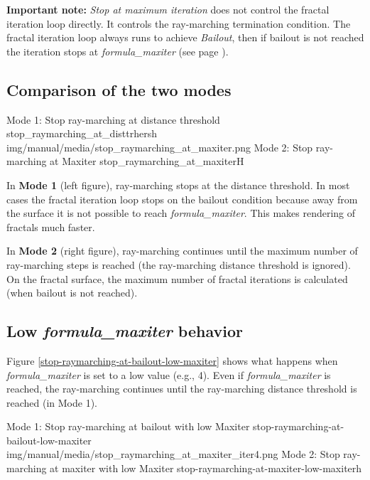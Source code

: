 \textbf{Important note:} \emph{Stop at maximum iteration} does not control the fractal iteration loop directly. It controls the ray-marching termination condition. The fractal iteration loop always runs to achieve \emph{Bailout}, then if bailout is not reached the iteration stops at \emph{formula\_maxiter} (see page \pageref{bailout-maxiter}).

\clearpage

\subsection{Comparison of the two modes}

{Mode 1: Stop ray-marching at distance threshold}
{stop_raymarching_at_disttrhersh}
{img/manual/media/stop_raymarching_at_maxiter.png}
{Mode 2: Stop ray-marching at Maxiter}
{stop_raymarching_at_maxiter}{H}

In \textbf{Mode 1} (left figure), ray-marching stops at the distance threshold. In most cases the fractal iteration loop stops on the bailout condition because away from the surface it is not possible to reach \emph{formula\_maxiter}. This makes rendering of fractals much faster.

In \textbf{Mode 2} (right figure), ray-marching continues until the maximum number of ray-marching steps is reached (the ray-marching distance threshold is ignored). On the fractal surface, the maximum number of fractal iterations is calculated (when bailout is not reached).

\subsection{Low \emph{formula\_maxiter} behavior}

Figure \ref{stop-raymarching-at-bailout-low-maxiter} shows what happens when \emph{formula\_maxiter} is set to a low value (e.g., 4). Even if \emph{formula\_maxiter} is reached, the ray-marching continues until the ray-marching distance threshold is reached (in Mode 1).

{Mode 1: Stop ray-marching at bailout with low Maxiter}
{stop-raymarching-at-bailout-low-maxiter}
{img/manual/media/stop_raymarching_at_maxiter_iter4.png}
{Mode 2: Stop ray-marching at maxiter with low Maxiter}
{stop-raymarching-at-maxiter-low-maxiter}{h}

